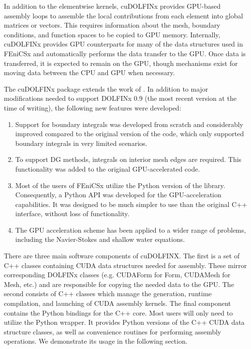 In addition to the elementwise kernels, cuDOLFINx provides GPU-based assembly loops to assemble the local contributions from each element into global matrices or vectors. This requires information about the mesh, boundary conditions, and function spaces to be copied to GPU memory. Internally, cuDOLFINx provides GPU counterparts for many of the data structures used in FEniCSx and automatically performs the data transfer to the GPU. Once data is transferred, it is expected to remain on the GPU, though mechanisms exist for moving data between the CPU and GPU when necessary.

The cuDOLFINx package extends the work of \cite{trotter2023targeting}. In addition to major modifications needed to support DOLFINx 0.9 (the most recent version at the time of writing), the following new features were developed:
\begin{enumerate}
    \item Support for boundary integrals was developed from scratch and considerably improved compared to the original version of the code, which only supported boundary integrals in very limited scenarios.
    \item To support DG methods, integrals on interior mesh edges are required. This functionality was added to the original GPU-accelerated code.
    \item Most of the users of FEniCSx utilize the Python version of the library. Consequently, a Python API was developed for the GPU-acceleration capabilities. It was designed to be much simpler to use than the original C++ interface, without loss of functionality.
    \item The GPU acceleration scheme has been applied to a wider range of problems, including the Navier-Stokes and shallow water equations.
\end{enumerate}

There are three main software components of cuDOLFINX. The first is a set of C++ classes containing CUDA data structures needed for assembly. These mirror corresponding DOLFINx classes (e.g. CUDAForm for Form, CUDAMesh for Mesh, etc.) and are responsible for copying the needed data to the GPU. The second consists of C++ classes which manage the generation, runtime compilation, and launching of CUDA assembly kernels. The final component contains the Python bindings for the C++ core. Most users will only need to utilize the Python wrapper. It provides Python versions of the C++ CUDA data structure classes, as well as convenience routines for performing assembly operations. We demonstrate its usage in the following section.

